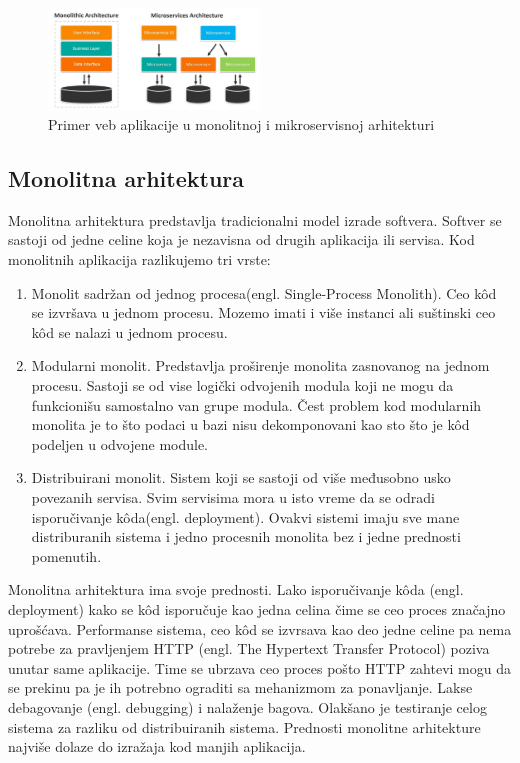 \documentclass[12pt,oneside]{memoir}
\begin{document}
\begin{figure}[!ht]
  \centering
  \includegraphics[width=0.5\textwidth]{Slika 6.jpg}
  \caption{Primer veb aplikacije u monolitnoj i mikroservisnoj arhitekturi}
  \label{fig:arhitekturniProjektniUzorci}
\end{figure}

\subsection{Monolitna arhitektura}
Monolitna arhitektura predstavlja tradicionalni model izrade softvera. Softver se sastoji od jedne celine koja je nezavisna od drugih aplikacija ili servisa. Kod monolitnih aplikacija razlikujemo tri vrste\cite{bm}:
\begin{enumerate}
  \item Monolit sadržan od jednog procesa(engl. Single-Process Monolith). Ceo kôd se izvršava u jednom procesu. Mozemo imati i više instanci ali suštinski ceo kôd se nalazi u jednom procesu. 
  \item Modularni monolit. Predstavlja proširenje monolita zasnovanog na jednom procesu. Sastoji se od vise logički odvojenih modula koji ne mogu da funkcionišu samostalno van grupe modula. Čest problem kod modularnih monolita je to što podaci u bazi nisu dekomponovani kao sto što je kôd podeljen u odvojene module.
  \item Distribuirani monolit. Sistem koji se sastoji od više međusobno usko povezanih servisa. Svim servisima mora u isto vreme da se odradi isporučivanje kôda(engl. deployment). Ovakvi sistemi imaju sve mane distriburanih sistema i jedno procesnih monolita bez i jedne prednosti pomenutih.
\end{enumerate}
 
Monolitna arhitektura ima svoje prednosti. Lako isporučivanje kôda (engl. deployment) kako se kôd isporučuje kao jedna celina čime se ceo proces značajno uprošćava. Performanse sistema, ceo kôd se izvrsava kao deo jedne celine pa nema potrebe za pravljenjem HTTP (engl. The Hypertext Transfer Protocol) poziva unutar same aplikacije. Time se ubrzava ceo proces pošto HTTP zahtevi mogu da se prekinu pa je ih potrebno ograditi sa mehanizmom za ponavljanje. Lakse debagovanje (engl. debugging) i nalaženje bagova. Olakšano je testiranje celog sistema za razliku od distribuiranih sistema. Prednosti monolitne arhitekture najviše dolaze do izražaja kod manjih aplikacija\cite{bm}.
 
\end{document}
